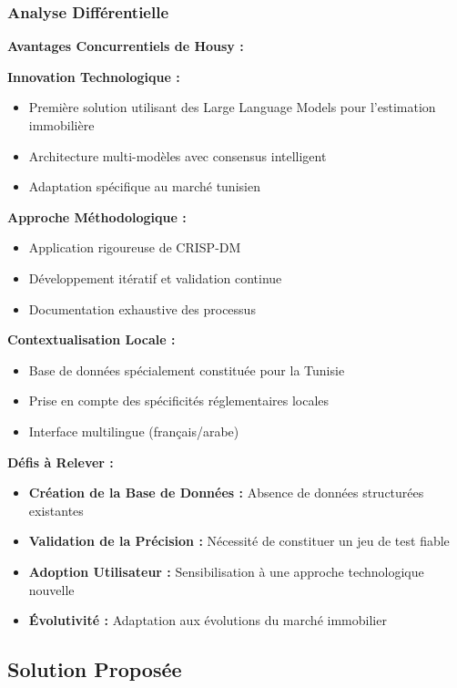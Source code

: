 \subsubsection{Analyse Différentielle}

\textbf{Avantages Concurrentiels de Housy :}

\textbf{Innovation Technologique :}
\begin{itemize}
    \item Première solution utilisant des Large Language Models pour l'estimation immobilière
    \item Architecture multi-modèles avec consensus intelligent
    \item Adaptation spécifique au marché tunisien
\end{itemize}

\textbf{Approche Méthodologique :}
\begin{itemize}
    \item Application rigoureuse de CRISP-DM
    \item Développement itératif et validation continue
    \item Documentation exhaustive des processus
\end{itemize}

\textbf{Contextualisation Locale :}
\begin{itemize}
    \item Base de données spécialement constituée pour la Tunisie
    \item Prise en compte des spécificités réglementaires locales
    \item Interface multilingue (français/arabe)
\end{itemize}

\textbf{Défis à Relever :}

\begin{itemize}
    \item \textbf{Création de la Base de Données :} Absence de données structurées existantes
    \item \textbf{Validation de la Précision :} Nécessité de constituer un jeu de test fiable
    \item \textbf{Adoption Utilisateur :} Sensibilisation à une approche technologique nouvelle
    \item \textbf{Évolutivité :} Adaptation aux évolutions du marché immobilier
\end{itemize}

\subsection{Solution Proposée}
\label{subsec:solution_proposee}

